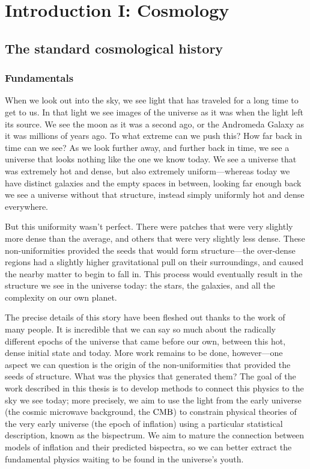 %
\chapter{Introduction I: Cosmology}\label{chapter:intro_general}
\section{The standard cosmological history}\label{sec:general_intro}
    \subsection{Fundamentals}
When we look out into the sky, we see light that has traveled for a long time to get to us.
In that light we see images of the universe as it was when the light left its source.
We see the moon as it was a second ago, or the Andromeda Galaxy as it was millions of
years ago. To what extreme can we push this? How far back in time can we see? As we look further
away, and further back in time, we see a universe that looks nothing like the one we know today.
We see a universe that was extremely hot and dense, but also extremely uniform---whereas today
we have distinct galaxies and the empty spaces in between, looking far enough back we see a universe
without that structure, instead simply uniformly hot and dense everywhere.


But this uniformity wasn't perfect. There were patches that were very slightly more dense than the average,
and others that were very slightly less dense. These non-uniformities provided the seeds that would form
structure---the over-dense regions had a slightly higher gravitational pull on their surroundings,
and caused the nearby matter to begin to fall in. This process would eventually result in the structure
we see in the universe today: the stars, the galaxies, and all the complexity on our own planet.


The precise details of this story have been fleshed out thanks to the work of many people.
It is incredible that we can say so much about the radically different epochs of the universe that came before our own,
between this hot, dense initial state and today.
More work remains to be done, however---one aspect we can question is the origin of the non-uniformities
that provided the seeds of structure. What was the physics that generated them?
The goal of the work described in this thesis is to develop methods to connect this physics
to the sky we see today; more precisely, we aim to use the light from the early universe (the cosmic microwave
background, the $\text{CMB}$)
to constrain physical theories of the very early universe (the epoch of inflation) using a particular
statistical description, known as the bispectrum.
We aim to mature the connection between models of inflation and their predicted bispectra, so we can better
extract the fundamental physics waiting to be found in the universe's youth.


